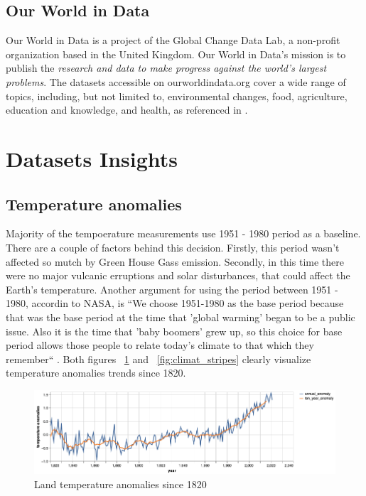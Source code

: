 \subsection{Our World in Data}
Our World in Data is a project of the Global Change Data Lab, a non-profit organization based in the United Kingdom.
Our World in Data’s mission is to publish the \textit{research and data to make progress against the world’s largest problems}.
The datasets accessible on ourworldindata.org cover a wide range of topics, including, but not limited to, environmental changes, food, agriculture, education and knowledge, and health, as referenced in \cite{ourworldindata}.

\section{Datasets Insights}

\subsection{Temperature anomalies}

Majority of the tempoerature measurements use 1951 - 1980 period as a baseline. There are a couple of factors behind this decision. Firstly, this period wasn't affected so mutch by Green House Gass emission. 
Secondly, in this time there were no major vulcanic erruptions and solar disturbances, that could affect the Earth's temperature. Another argument for using the period between 1951 - 1980, accordin to NASA, is
``We choose 1951-1980 as the base period because that was the base period at the time that 'global warming' began to be a public issue. Also it is the time that 'baby boomers' grew up, so this choice for base period allows those people to relate today's climate to that which they remember`` \cite{nasa-giss}.
Both figures ~\ref{fig:temperature_anomalies} and ~\ref{fig:climat_stripes} clearly visualize temperature anomalies trends since 1820.

\begin{figure}[h]
  \includegraphics[width=\linewidth]{img/temperature_anomalies.png}
  \caption{Land temperature anomalies since 1820}
  \label{fig:temperature_anomalies}
\end{figure}

